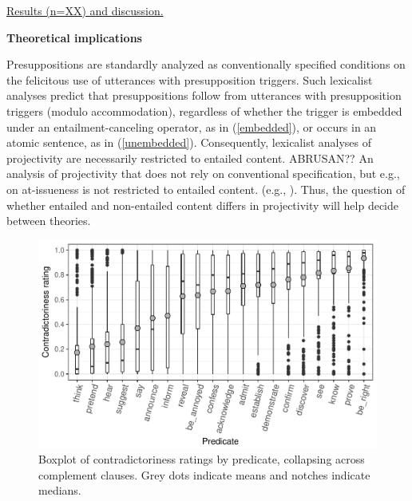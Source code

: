 \documentclass[12pt,fleqn]{article}
\newcommand{\6}{\mbox{$[\hspace*{-.6mm}[$}}
\newcommand{\9}{\mbox{$]\hspace*{-.6mm}]$}}
\begin{document}
\underline{Results (n=XX) and discussion.} 

{\bf Theoretical implications}

Presuppositions are standardly analyzed as conventionally specified conditions on the felicitous use of utterances with presupposition triggers. Such lexicalist analyses predict that presuppositions follow from utterances with presupposition triggers (modulo accommodation), regardless of whether the trigger is embedded under an entailment-canceling operator, as in (\ref{embedded}), or occurs in an atomic sentence, as in (\ref{unembedded}). Consequently, lexicalist analyses of projectivity are necessarily restricted to entailed content. ABRUSAN?? An analysis of projectivity that does not rely on conventional specification, but e.g., on at-issueness is not restricted to entailed content. (e.g., \citealt{brst-salt10,brst-ar,abrusan2011,abrusan2013}). Thus, the question of whether entailed and non-entailed content differs in projectivity will help decide between theories. 


\newpage

\begin{figure}[h!]
\centering

\includegraphics[width=.6\paperwidth]{../results/2-veridicality2/graphs/boxplot-veridicality}

\caption{Boxplot of contradictoriness ratings by predicate, collapsing across complement clauses. Grey dots indicate means and notches indicate medians.}
\label{f-veridicality}
\end{figure}


\begin{scriptsize}


\end{scriptsize}
\end{document}

